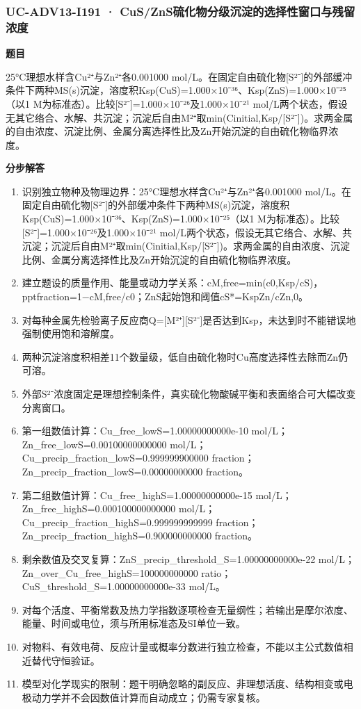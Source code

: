 \documentclass[UTF8,11pt,a4paper]{ctexart}
\begin{document}
\subsubsection*{UC-ADV13-I191 · CuS/ZnS硫化物分级沉淀的选择性窗口与残留浓度}
\noindent\textbf{题目}\par
25°C理想水样含Cu²⁺与Zn²⁺各0.001000 mol/L。在固定自由硫化物[S²⁻]的外部缓冲条件下两种MS(s)沉淀，溶度积Ksp(CuS)=1.000×10⁻³⁶、Ksp(ZnS)=1.000×10⁻²⁵（以1 M为标准态）。比较[S²⁻]=1.000×10⁻²⁶及1.000×10⁻²¹ mol/L两个状态，假设无其它络合、水解、共沉淀；沉淀后自由M²⁺取min(Cinitial,Ksp/[S²⁻])。求两金属的自由浓度、沉淀比例、金属分离选择性比及Zn开始沉淀的自由硫化物临界浓度。\par
\medskip\noindent\textbf{分步解答}
\begin{enumerate}
\item 识别独立物种及物理边界：25°C理想水样含Cu²⁺与Zn²⁺各0.001000 mol/L。在固定自由硫化物[S²⁻]的外部缓冲条件下两种MS(s)沉淀，溶度积Ksp(CuS)=1.000×10⁻³⁶、Ksp(ZnS)=1.000×10⁻²⁵（以1 M为标准态）。比较[S²⁻]=1.000×10⁻²⁶及1.000×10⁻²¹ mol/L两个状态，假设无其它络合、水解、共沉淀；沉淀后自由M²⁺取min(Cinitial,Ksp/[S²⁻])。求两金属的自由浓度、沉淀比例、金属分离选择性比及Zn开始沉淀的自由硫化物临界浓度。
\item 建立题设的质量作用、能量或动力学关系：cM,free=min(c0,Ksp/cS)，pptfraction=1−cM,free/c0；ZnS起始饱和阈值cS*=KspZn/cZn,0。
\item 对每种金属先检验离子反应商Q=[M²⁺][S²⁻]是否达到Ksp，未达到时不能错误地强制使用饱和溶解度。
\item 两种沉淀溶度积相差11个数量级，低自由硫化物时Cu高度选择性去除而Zn仍可溶。
\item 外部S²⁻浓度固定是理想控制条件，真实硫化物酸碱平衡和表面络合可大幅改变分离窗口。
\item 第一组数值计算：Cu\_free\_lowS=1.00000000000e-10 mol/L；Zn\_free\_lowS=0.00100000000000 mol/L；Cu\_precip\_fraction\_lowS=0.999999900000 fraction；Zn\_precip\_fraction\_lowS=0.00000000000 fraction。
\item 第二组数值计算：Cu\_free\_highS=1.00000000000e-15 mol/L；Zn\_free\_highS=0.000100000000000 mol/L；Cu\_precip\_fraction\_highS=0.999999999999 fraction；Zn\_precip\_fraction\_highS=0.900000000000 fraction。
\item 剩余数值及交叉复算：ZnS\_precip\_threshold\_S=1.00000000000e-22 mol/L；Zn\_over\_Cu\_free\_highS=100000000000 ratio；CuS\_threshold\_S=1.00000000000e-33 mol/L。
\item 对每个活度、平衡常数及热力学指数逐项检查无量纲性；若输出是摩尔浓度、能量、时间或电位，须与所用标准态及SI单位一致。
\item 对物料、有效电荷、反应计量或概率分数进行独立检查，不能以主公式数值相近替代守恒验证。
\item 模型对化学现实的限制：题干明确忽略的副反应、非理想活度、结构相变或电极动力学并不会因数值计算而自动成立；仍需专家复核。
\end{enumerate}
\end{document}
